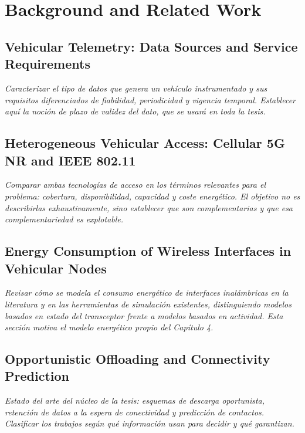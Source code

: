 \chapter{Background and Related Work}


\section{Vehicular Telemetry: Data Sources and Service Requirements}
\emph{Caracterizar el tipo de datos que genera un vehículo instrumentado y sus
requisitos diferenciados de fiabilidad, periodicidad y vigencia temporal.
Establecer aquí la noción de plazo de validez del dato, que se usará en toda la
tesis.}

\section{Heterogeneous Vehicular Access: Cellular 5G NR and IEEE 802.11}
\emph{Comparar ambas tecnologías de acceso en los términos relevantes para el
problema: cobertura, disponibilidad, capacidad y coste energético. El objetivo no
es describirlas exhaustivamente, sino establecer que son complementarias y que
esa complementariedad es explotable.}

\section{Energy Consumption of Wireless Interfaces in Vehicular Nodes}
\emph{Revisar cómo se modela el consumo energético de interfaces inalámbricas en
la literatura y en las herramientas de simulación existentes, distinguiendo
modelos basados en estado del transceptor frente a modelos basados en actividad.
Esta sección motiva el modelo energético propio del Capítulo 4.}

\section{Opportunistic Offloading and Connectivity Prediction}
\emph{Estado del arte del núcleo de la tesis: esquemas de descarga oportunista,
retención de datos a la espera de conectividad y predicción de contactos.
Clasificar los trabajos según qué información usan para decidir y qué garantizan.}

